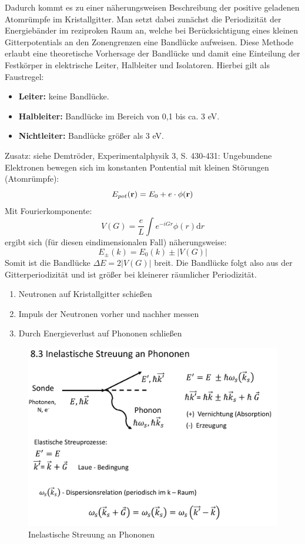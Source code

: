 Dadurch kommt es zu einer näherungsweisen Beschreibung der positive geladenen Atomrümpfe im Kristallgitter. Man setzt dabei zunächst die Periodizität der Energiebänder im reziproken Raum an, welche bei Berücksichtigung eines kleinen Gitterpotentials an den Zonengrenzen eine Bandlücke aufweisen. 
Diese Methode erlaubt eine theoretische Vorhersage der Bandlücke und damit eine Einteilung der Festkörper in elektrische Leiter, Halbleiter und Isolatoren.
Hierbei gilt als Faustregel:

\begin{itemize}
    \item \textbf{Leiter:} keine Bandlücke.
    \item \textbf{Halbleiter:} Bandlücke im Bereich von 0,1 bis ca. 3 eV.
    \item \textbf{Nichtleiter:} Bandlücke größer als 3 eV.
\end{itemize}

Zusatz: siehe Demtröder, Experimentalphysik 3, S. 430-431:
Ungebundene Elektronen bewegen sich im konstanten Pontential mit kleinen Störungen (Atomrümpfe): 
\[E_{pot}(\vb{r}) = E_0 + e \cdot \phi(\vb{r})\]
Mit Fourierkomponente: 
\[V(G) = \frac{e}{L}\int e^{-iGr}\phi(r) \text{d}r\]
ergibt sich (für diesen eindimensionalen Fall) näherungsweise: 
\[E_{\pm}(k) = E_0(k) \pm \left|V(G)\right|\]
Somit ist die Bandlücke $\Delta E = 2\left|V(G)\right|$ breit. 
Die Bandlücke folgt also aus der Gitterperiodizität und ist größer bei kleinerer räumlicher Periodizität. 
\label{q:6}

\begin{enumerate}
    \item Neutronen auf Kristallgitter schießen
    \item Impuls der Neutronen vorher und nachher messen
    \item Durch Energieverlust auf Phononen schließen
\end{enumerate}

\begin{figure}[H]  
    \centering
    \includegraphics[width=.8\textwidth]{resources/05-01-2015/Frage6_1.png}
    \caption{Inelastische Streuung an Phononen}
\end{figure}

